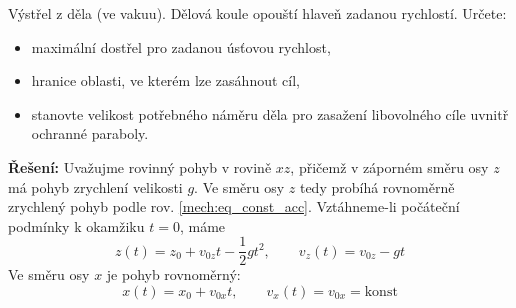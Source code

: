 \begin{example}Výstřel z děla (ve vakuu).
  Dělová koule opouští hlaveň zadanou rychlostí. Určete:
  \begin{itemize}[noitemsep]
    \item maximální dostřel pro zadanou úsťovou rychlost,
    \item hranice oblasti, ve kterém lze zasáhnout cíl,
    \item stanovte velikost potřebného náměru děla pro zasažení libovolného cíle uvnitř ochranné paraboly.
  \end{itemize}

  {\centering
        \newline
  \captionsetup{type=figure}  
  \label{fyz:fig223}
  \par}

  \textbf{Řešení:}
  Uvažujme rovinný pohyb v rovině $xz$, přičemž v záporném směru osy $z$ má pohyb zrychlení 
  velikosti $g$. Ve směru osy $z$ tedy probíhá rovnoměrně zrychlený pohyb podle rov. 
  \ref{mech:eq_const_acc}. Vztáhneme-li počáteční podmínky k okamžiku \(t = 0\), máme
  \begin{equation}\label{mech_eq_delo_vakuum_osa_z}
    z(t)=z_0+v_{0z}t-\frac{1}{2}gt^2, \qquad v_z(t)=v_{0z}-gt
  \end{equation}
  Ve směru osy $x$ je pohyb rovnoměrný:
  \begin{equation}\label{mech_eq_delo_vakuum_osa_x}
    x(t)=x_0+v_{0x} t,\qquad v_x(t)=v_{0x}=\mathrm{konst}
  \end{equation}


\end{example}
